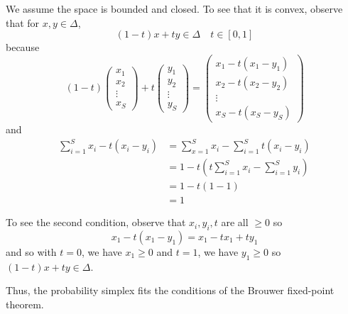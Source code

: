 \documentclass[11pt,letterpaper, leqno]{article}
\numberwithin{equation}{section}
\numberwithin{theorem}{section}
\numberwithin{lemma}{section}
\numberwithin{corollary}{section}
\numberwithin{definition}{section}
\numberwithin{proposition}{section}
\numberwithin{remark}{section}
\numberwithin{example}{section}
\begin{document}
\begin{enumerate}
            We assume the space is bounded and closed. To see that it is convex, observe that for $x, y \in \Delta$, 
            \[(1 - t)x + ty \in \Delta \quad t \in [0, 1]\]
            because 
            \[(1-t)\begin{pmatrix}
                x_1\\
                x_2\\
                \vdots\\
                x_S
            \end{pmatrix} + t\begin{pmatrix}
                y_1\\
                y_2\\
                \vdots\\
                y_S
            \end{pmatrix} = \begin{pmatrix}
                x_1 - t(x_1 - y_1)\\
                x_2 - t(x_2 - y_2)\\
                \vdots\\
                x_S - t(x_S - y_S)
            \end{pmatrix}\]
            and 
            \begin{align*}
                \sum_{i=1}^S x_i - t(x_i - y_i) &= \sum_{x=1}^S x_i - \sum_{i=1}^S t(x_i - y_i)\\
                &= 1 - t\left(t \sum_{i=1}^S x_i - \sum_{i=1}^S y_i\right)\\
                &= 1 - t(1 - 1)\\
                &= 1
            \end{align*}

            To see the second condition, observe that $x_i, y_i, t$ are all $\geq 0$ so 
            \[x_1 - t(x_1 - y_1) = x_1 - tx_1 + ty_1\]
            and so with $t = 0$, we have $x_1 \geq 0$ and $t = 1$, we have $y_1 \geq 0$ so $(1 - t)x + ty \in \Delta$.

            Thus, the probability simplex fits the conditions of the Brouwer fixed-point theorem.


\end{enumerate}
\end{document}
